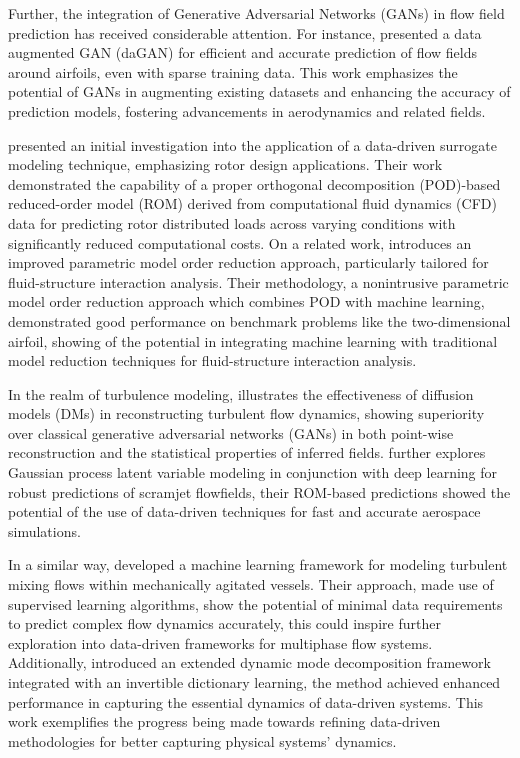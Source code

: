 Further, the integration of Generative Adversarial Networks (GANs) in flow field prediction has received considerable attention. For instance, \citet{WU2022a} presented a data augmented GAN (daGAN) for efficient and accurate prediction of flow fields around airfoils, even with sparse training data. This work emphasizes the potential of GANs in augmenting existing datasets and enhancing the accuracy of prediction models, fostering advancements in aerodynamics and related fields.

\citet{Peters2023} presented an initial investigation into the application of a data-driven surrogate modeling technique, emphasizing rotor design applications. Their work demonstrated the capability of a proper orthogonal decomposition (POD)-based reduced-order model (ROM) derived from computational fluid dynamics (CFD) data for predicting rotor distributed loads across varying conditions with significantly reduced computational costs. On a related work, \citet{Lee2024} introduces an improved parametric model order reduction approach, particularly tailored for fluid-structure interaction analysis. Their methodology, a nonintrusive parametric model order reduction approach which combines POD with machine learning, demonstrated good performance on benchmark problems like the two-dimensional airfoil, showing of the potential in integrating machine learning with traditional model reduction techniques for fluid-structure interaction analysis.

In the realm of turbulence modeling, \citet{Li2024} illustrates the effectiveness of diffusion models (DMs) in reconstructing turbulent flow dynamics, showing superiority over classical generative adversarial networks (GANs) in both point-wise reconstruction and the statistical properties of inferred fields. \citet{Fujio2023} further explores Gaussian process latent variable modeling in conjunction with deep learning for robust predictions of scramjet flowfields, their ROM-based predictions showed the potential of the use of data-driven techniques for fast and accurate aerospace simulations.

In a similar way, \citet{Li2023a} developed a machine learning framework for modeling turbulent mixing flows within mechanically agitated vessels. Their approach, made use of supervised learning algorithms, show the potential of minimal data requirements to predict complex flow dynamics accurately, this could inspire further exploration into data-driven frameworks for multiphase flow systems. Additionally, \cite{Jin2024} introduced an extended dynamic mode decomposition framework integrated with an invertible dictionary learning, the method achieved enhanced performance in capturing the essential dynamics of data-driven systems. This work exemplifies the progress being made towards refining data-driven methodologies for better capturing physical systems' dynamics.

